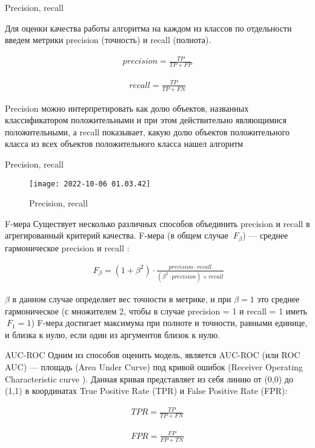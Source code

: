 \documentclass[11pt]{beamer}
\begin{document}
\begin{frame}{Precision, recall}
	
	Для оценки качества работы алгоритма на каждом из классов по отдельности введем метрики precision (точность) и recall (полнота).
	
	\begin{align*}
		precision = \frac{TP}{TP + FP}
	\end{align*}
	
	\begin{align*}
		recall = \frac{TP}{TP + FN}
	\end{align*}

	Precision можно интерпретировать как долю объектов, названных классификатором положительными и при этом действительно являющимися положительными, а recall показывает, какую долю объектов положительного класса из всех объектов положительного класса нашел алгоритм
	
\end{frame}

\begin{frame}{Precision, recall}
	\begin{figure}[hhh!]
		\begin{center}
			\texttt{[image: 2022-10-06 01.03.42]}
		\end{center}
		\vspace{-5mm}\caption{Precision, recall}
	\end{figure}
\end{frame}

\begin{frame}{F-мера}
Существует несколько различных способов объединить precision и recall в агрегированный критерий качества. F-мера (в общем случае $\ F_\beta$) — среднее гармоническое precision и recall :

\begin{align*}
	\ F_\beta = (1 + \beta^2) \cdot \frac{precision \cdot recall}{(\beta^2 \cdot precision) + recall}
\end{align*}

$\beta$ в данном случае определяет вес точности в метрике, и при $\beta = 1$ это среднее гармоническое (с множителем 2, чтобы в случае precision = 1 и recall = 1 иметь $\ F_1 = 1$)
F-мера достигает максимума при полноте и точности, равными единице, и близка к нулю, если один из аргументов близок к нулю.
\end{frame}

\begin{frame}{AUC-ROC}
	Одним из способов оценить модель, является AUC-ROC (или ROC AUC) — площадь (Area Under Curve) под кривой ошибок (Receiver Operating Characteristic curve ). Данная кривая представляет из себя линию от (0,0) до (1,1) в координатах True Positive Rate (TPR) и False Positive Rate (FPR):
	
	\begin{align*}
		TPR = \frac{TP}{TP + FN}
	\end{align*}	
	
	\begin{align*}
		FPR = \frac{FP}{FP + TN}
	\end{align*}

\end{frame}
\end{document}
